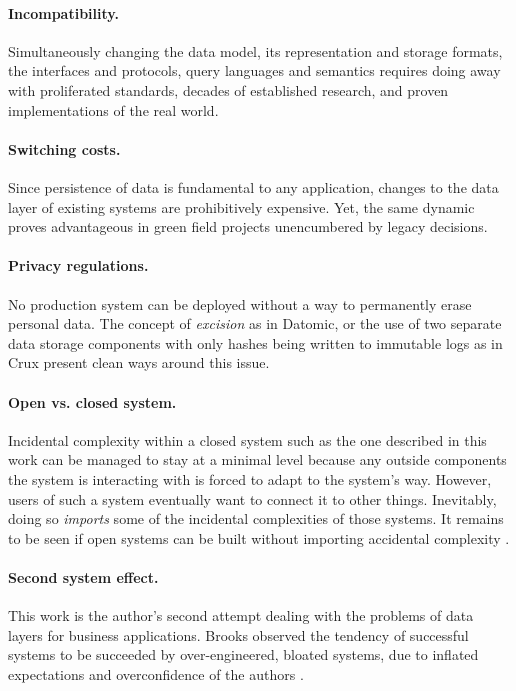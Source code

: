 \paragraph{Incompatibility.} Simultaneously changing the data model, its representation and storage formats, the interfaces and protocols, query languages and semantics requires doing away with proliferated standards, decades of established research, and proven implementations of the real world.

\paragraph{Switching costs.} Since persistence of data is fundamental to any application, changes to the data layer of existing systems are prohibitively expensive. Yet, the same dynamic proves advantageous in green field projects unencumbered by legacy decisions.

\paragraph{Privacy regulations.} No production system can be deployed without a way to permanently erase personal data. The concept of \emph{excision} as in Datomic, or the use of two separate data storage components with only hashes being written to immutable logs as in Crux present clean ways around this issue.

\paragraph{Open vs. closed system.} Incidental complexity within a closed system such as the one described in this work can be managed to stay at a minimal level because any outside components the system is interacting with is forced to adapt to the system's way. However, users of such a system eventually want to connect it to other things. Inevitably, doing so \emph{imports} some of the incidental complexities of those systems. It remains to be seen if open systems can be built without importing accidental complexity \cite{moffat16eve}.

\paragraph{Second system effect.} This work is the author's second attempt dealing with the problems of data layers for business applications. Brooks observed the tendency of successful systems to be succeeded by over-engineered, bloated systems, due to inflated expectations and overconfidence of the authors \cite{brooks1995mythical}.
